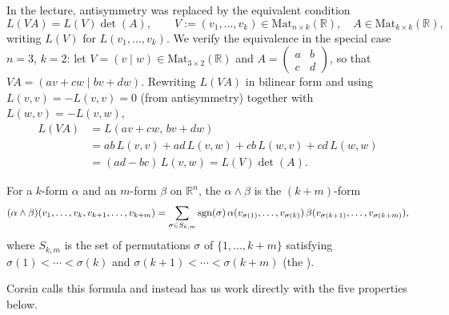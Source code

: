 \begin{remark}
In the lecture, antisymmetry was replaced by the equivalent condition
\[L(VA) = L(V)\det(A), \qquad V := (v_1,\ldots,v_k) \in \mathrm{Mat}_{n\times k}(\mathbb{R}),
  \quad A \in \mathrm{Mat}_{k\times k}(\mathbb{R}),\]
writing $L(V)$ for $L(v_1,\ldots,v_k)$. We verify the equivalence in the special case $n=3$,
$k=2$: let $V = (v\mid w) \in \mathrm{Mat}_{3\times2}(\mathbb{R})$ and $A = \begin{pmatrix} a &
b \\ c & d \end{pmatrix}$, so that $VA = (av+cw \mid bv+dw)$. Rewriting $L(VA)$ in bilinear
form and using $L(v,v) = -L(v,v) = 0$ (from antisymmetry) together with $L(w,v) = -L(v,w)$,
\begin{align}
L(VA) &= L(av+cw,\,bv+dw) \nonumber \\
  &= ab\,L(v,v) + ad\,L(v,w) + cb\,L(w,v) + cd\,L(w,w) \nonumber \\
  &= (ad-bc)\,L(v,w) = L(V)\det(A). \nonumber
\end{align}
\end{remark}

\begin{definition}
\label{def:wedge_product}
For a $k$-form $\alpha$ and an $m$-form $\beta$ on $\mathbb{R}^n$, the 
 $\alpha \wedge \beta$ is the $(k+m)$-form
\[
(\alpha\wedge\beta)(v_1,\ldots,v_k,v_{k+1},\ldots,v_{k+m})
  = \sum_{\sigma \in S_{k,m}} \operatorname{sgn}(\sigma)\,\alpha(v_{\sigma(1)},\ldots,v_{\sigma(k)})\,
    \beta(v_{\sigma(k+1)},\ldots,v_{\sigma(k+m)}),
\]
where $S_{k,m}$ is the set of permutations $\sigma$ of $\{1,\ldots,k+m\}$ satisfying
$\sigma(1) < \cdots < \sigma(k)$ and $\sigma(k+1) < \cdots < \sigma(k+m)$ (the
).
\end{definition}

\begin{ainote}
Corsin calls this formula  and instead has us work
directly with the five properties below.
\end{ainote}

